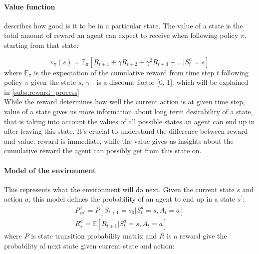 
\paragraph{Value function} describes how good is it to be in a particular state.
The value of a state is the total amount of reward an agent can expect
to receive when following policy $\pi$, starting from that state:

\begin{equation} \label{eq:general_value_function}
	v_{\pi}(s) = \mathbb{E}_{\pi} [R_{t+1} + \gamma R_{t+2} + \gamma^2 R_{t+3} + ... | S_t^a = s]
\end{equation}
where $\mathbb{E}_{\pi}$ is the expectation of the cumulative reward from time step $t$
following policy $\pi$ given the state $s$, $\gamma$ - is a discount factor [0, 1].
 which will be explained in \autoref{subs:reward_process}\\
While the reward determines how well the current action is at given time step, value of a state
gives us more information about long term desirability of a state, that is
taking into account
the values of all possible states an agent can end up in after leaving this state.
It's crucial to understand the difference between reward and value: reward is immediate,
while the value gives us insights about the cumulative reward the agent can possibly get
from this state on.

\paragraph{Model of the environment} This represents what the environment will do next. Given
the current state $s$ and action $a$, this model defines the probability of an agent to end up in
a state $s^\prime$:
\begin{align} \label{eq:model_env}
P^a_{ss^{\prime}} = P[S_{t+1} = s_0 | S_t^a = s, A_t = a] \\
R^a_s = \mathbb{E}[R_{t+1} | S_t^a = s, A_t = a]
\end{align}
where $P$ is state transition probability matrix and $R$ is a reward give
	the probability of next state given current state and action:

